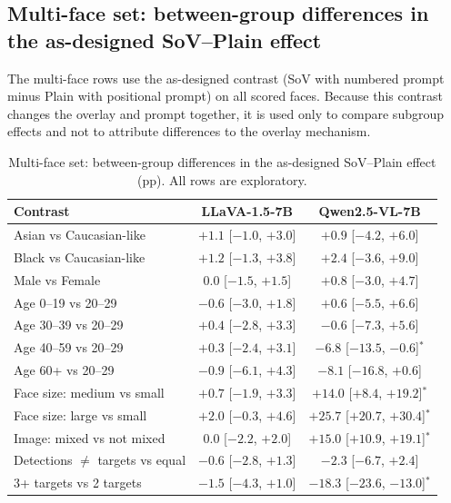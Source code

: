 \documentclass[lettersize,journal]{IEEEtran}
\begin{document}
\subsection{Multi-face set: between-group differences in the as-designed SoV--Plain effect}
The multi-face rows use the as-designed contrast (SoV with numbered prompt minus Plain with positional prompt) on all scored faces. Because this contrast changes the overlay and prompt together, it is used only to compare subgroup effects and not to attribute differences to the overlay mechanism.
\begin{table}[!t]
\caption{Multi-face set: between-group differences in the as-designed SoV--Plain effect (pp). All rows are exploratory.}
\label{tab:app_groups_multi}
\centering
\scriptsize
\setlength{\tabcolsep}{3pt}
\begin{tabular}{lcc}
\toprule
Contrast & LLaVA-1.5-7B & Qwen2.5-VL-7B \\
\midrule
Asian vs Caucasian-like & $+1.1$ [$-1.0$, $+3.0$] & $+0.9$ [$-4.2$, $+6.0$] \\
Black vs Caucasian-like & $+1.2$ [$-1.3$, $+3.8$] & $+2.4$ [$-3.6$, $+9.0$] \\
Male vs Female & $0.0$ [$-1.5$, $+1.5$] & $+0.8$ [$-3.0$, $+4.7$] \\
\midrule
Age 0--19 vs 20--29 & $-0.6$ [$-3.0$, $+1.8$] & $+0.6$ [$-5.5$, $+6.6$] \\
Age 30--39 vs 20--29 & $+0.4$ [$-2.8$, $+3.3$] & $-0.6$ [$-7.3$, $+5.6$] \\
Age 40--59 vs 20--29 & $+0.3$ [$-2.4$, $+3.1$] & $-6.8$ [$-13.5$, $-0.6$]$^{*}$ \\
Age 60+ vs 20--29 & $-0.9$ [$-6.1$, $+4.3$] & $-8.1$ [$-16.8$, $+0.6$] \\
\midrule
Face size: medium vs small & $+0.7$ [$-1.9$, $+3.3$] & $+14.0$ [$+8.4$, $+19.2$]$^{*}$ \\
Face size: large vs small & $+2.0$ [$-0.3$, $+4.6$] & $+25.7$ [$+20.7$, $+30.4$]$^{*}$ \\
Image: mixed vs not mixed & $0.0$ [$-2.2$, $+2.0$] & $+15.0$ [$+10.9$, $+19.1$]$^{*}$ \\
Detections $\neq$ targets vs equal & $-0.6$ [$-2.8$, $+1.3$] & $-2.3$ [$-6.7$, $+2.4$] \\
3+ targets vs 2 targets & $-1.5$ [$-4.3$, $+1.0$] & $-18.3$ [$-23.6$, $-13.0$]$^{*}$ \\
\bottomrule
\end{tabular}
\end{table}
\end{document}
